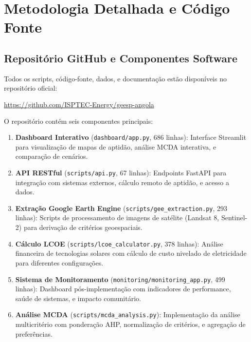 \documentclass[12pt, a4paper]{article}
\begin{document}
\section{Metodologia Detalhada e Código Fonte}

\subsection{Repositório GitHub e Componentes Software}

Todos os scripts, código-fonte, dados, e documentação estão disponíveis no repositório oficial:

\begin{center}
\url{https://github.com/ISPTEC-Energy/geesp-angola}
\end{center}

O repositório contém seis componentes principais:

\begin{enumerate}
    \item \textbf{Dashboard Interativo} (\texttt{dashboard/app.py}, 686 linhas): Interface Streamlit para visualização de mapas de aptidão, análise MCDA interativa, e comparação de cenários.
    
    \item \textbf{API RESTful} (\texttt{scripts/api.py}, 67 linhas): Endpoints FastAPI para integração com sistemas externos, cálculo remoto de aptidão, e acesso a dados.
    
    \item \textbf{Extração Google Earth Engine} (\texttt{scripts/gee\_extraction.py}, 293 linhas): Scripts de processamento de imagens de satélite (Landsat 8, Sentinel-2) para derivação de critérios geoespaciais.
    
    \item \textbf{Cálculo LCOE} (\texttt{scripts/lcoe\_calculator.py}, 378 linhas): Análise financeira de tecnologias solares com cálculo de custo nivelado de eletricidade para diferentes configurações.
    
    \item \textbf{Sistema de Monitoramento} (\texttt{monitoring/monitoring\_app.py}, 499 linhas): Dashboard pós-implementação com indicadores de performance, saúde de sistemas, e impacto comunitário.
    
    \item \textbf{Análise MCDA} (\texttt{scripts/mcda\_analysis.py}): Implementação da análise multicritério com ponderação AHP, normalização de critérios, e agregação de preferências.
\end{enumerate}
\end{document}
